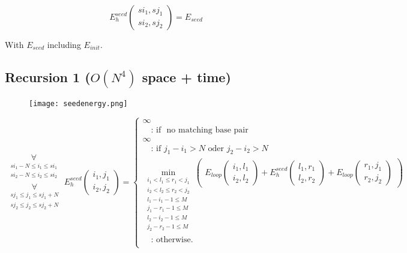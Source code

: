 \begin{equation*}
E_{h}^{seed}(\substack{si_1,sj_1\\si_2,sj_2}) = E_{seed}
\end{equation*}

With $E_{seed}$ including $E_{init}$.

\clearpage

\subsection{Recursion 1 ($O(N^{4})$ space + time)}

\begin{figure}[H]
	\centering
	\texttt{[image: seedenergy.png]}
\end{figure}

\begin{equation*}
\substack{
  \underset{\substack{si_{1}-N \le i_{1} \le si_{1}\\si_{2}-N \le i_{2} \le si_{2}}}{\forall}\\
  \underset{\substack{sj_{1} \le j_{1} \le sj_{1}+N\\sj_{2} \le j_{2} \le sj_{2}+N}}{\forall}
}
E_{h}^{seed}(\substack{i_1,j_1\\i_2,j_2}) = \begin{cases}
  \infty\\
  \quad\text{: if } \text{ no matching base pair }\\
  \infty\\
  \quad\text{: if } j_{1} - i_{1} > N \text{ oder } j_{2} - i_{2} > N\\
  \min\limits_{\substack{i_{1} < l_{1} \le r_{1} < j_{1}\\i_{2} < l_{2} \le r_{2} < j_{2}\\l_{1} - i_{1} - 1 \le M\\j_{1}-r_{1}-1 \le M\\l_{2} - i_{2} - 1 \le M\\j_{2}-r_{2}-1 \le M}}
  \begin{pmatrix}
	E_{loop}(\substack{i_1,l_1\\i_2,l_2}) + E_{h}^{seed}(\substack{l_1,r_1\\l_2,r_2}) + E_{loop}(\substack{r_1,j_1\\r_2,j_2})
  \end{pmatrix}\\
  \quad\text{: otherwise.}\\
  
\end{cases}
\end{equation*}

